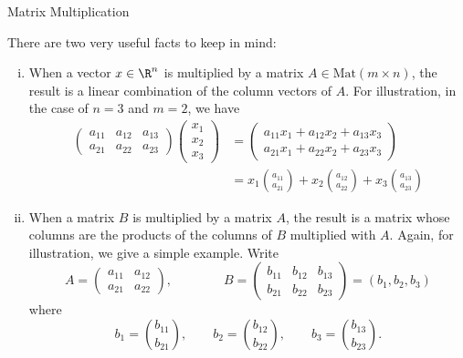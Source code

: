 \documentclass[smaller,hyperref={CJKbookmarks=true}]{beamer}
\begin{document}
\begin{frame}{Matrix Multiplication}
\begin{spacing}{1}
There are two very useful facts to keep in mind:
\begin{enumerate}[(i)]
  \item When a vector $x\in\R^n$ is multiplied by a matrix $A\in\text{Mat}(m\times n)$, the result is a linear combination of the column vectors of $A$. For illustration, in the case of $n=3$ and $m=2$, we have
      \begin{equation*}
        \begin{split}
           \begin{pmatrix}
             a_{11} & a_{12} & a_{13} \\
             a_{21} & a_{22} & a_{23}
           \end{pmatrix}\begin{pmatrix}
                          x_1 \\
                          x_2 \\
                          x_3
                        \end{pmatrix} &=\begin{pmatrix}
                            a_{11}x_1+a_{12}x_2+a_{13}x_3 \\
                            a_{21}x_1+a_{22}x_2+a_{23}x_3
                          \end{pmatrix} \\
             &=x_1\binom{a_{11}}{a_{21}}+x_2\binom{a_{12}}{a_{22}}+x_3\binom{a_{13}}{a_{23}}
        \end{split}
      \end{equation*}
  \item When a matrix $B$ is multiplied by a matrix $A$, the result is a matrix
whose columns are the products of the columns of $B$ multiplied with
$A$. Again, for illustration, we give a simple example.
\newpage
Write
\[A=\begin{pmatrix}
      a_{11} & a_{12} \\
      a_{21} & a_{22}
    \end{pmatrix},\qquad\qquad B=\begin{pmatrix}
        b_{11} & b_{12} & b_{13} \\
        b_{21} & b_{22} & b_{23}
      \end{pmatrix}=(b_1,b_2,b_3)\]
where
\[b_1=\binom{b_{11}}{b_{21}},\qquad b_2=\binom{b_{12}}{b_{22}},\qquad
b_3=\binom{b_{13}}{b_{23}}.\]

\end{enumerate}
\end{spacing}
\end{frame}
\end{document}
